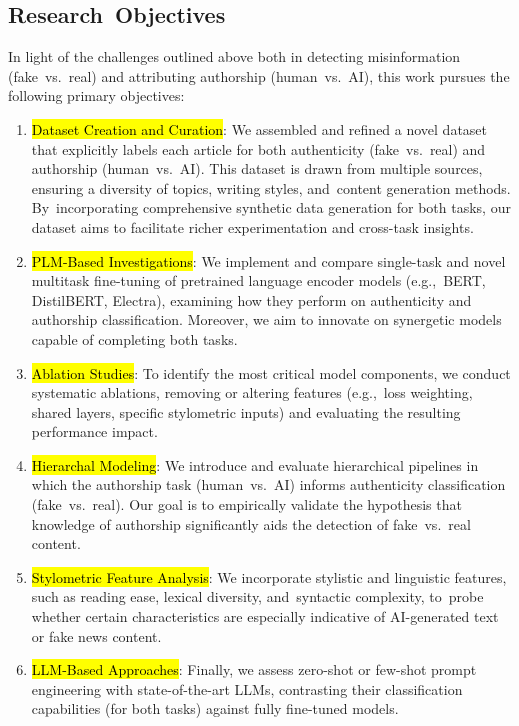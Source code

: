 \documentclass[electronics,article,accept,pdftex,moreauthors,electronics]{Definitions/mdpi}
\begin{document}
\subsection{Research~Objectives}

In light of the challenges outlined above both in detecting misinformation (fake~vs.~real) and attributing authorship (human~vs.~AI), this work pursues the following primary \mbox{objectives}:
\begin{enumerate}
    \item {\hl{Dataset Creation and Curation}}: We assembled and refined a novel dataset that explicitly labels each article for both authenticity (fake~vs.~real) and authorship (human~vs.~AI). This dataset is drawn from multiple sources, ensuring a diversity of topics, writing styles, and~content generation methods. By~incorporating comprehensive synthetic data generation for both tasks, our dataset aims to facilitate richer experimentation and cross-task insights.
    \item {\hl{PLM-Based Investigations}}: We implement and compare single-task and novel multitask fine-tuning of pretrained language encoder models (e.g.,~BERT, DistilBERT, Electra), examining how they perform on authenticity and authorship classification. Moreover, we aim to innovate on synergetic models capable of completing both tasks.
    \item {\hl{Ablation Studies}}: To identify the most critical model components, we conduct systematic ablations, removing or altering features (e.g.,~loss weighting, shared layers, specific stylometric inputs) and evaluating the resulting performance impact.
    \item {\hl{Hierarchal Modeling}}: We introduce and evaluate hierarchical pipelines in which the authorship task (human~vs.~AI) informs authenticity classification (fake~vs.~real). Our goal is to empirically validate the hypothesis that knowledge of authorship significantly aids the detection of fake~vs.~real content.
    \item {\hl{Stylometric Feature Analysis}}: We incorporate stylistic and linguistic features, such as reading ease, lexical diversity, and~syntactic complexity, to~probe whether certain characteristics are especially indicative of AI-generated text or fake news content.
    \item {\hl{LLM-Based Approaches}}: Finally, we assess zero-shot or few-shot prompt engineering with state-of-the-art LLMs, contrasting their classification capabilities (for both tasks) against fully fine-tuned models.
\end{enumerate}
\end{document}
